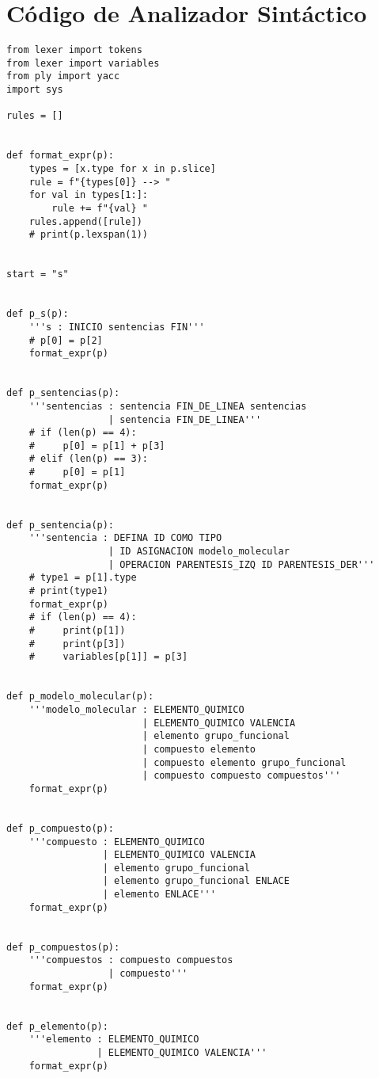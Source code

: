 \label{apendixA}


\chapter{Código de Analizador Sintáctico}

\begin{verbatim}
from lexer import tokens
from lexer import variables
from ply import yacc
import sys

rules = []


def format_expr(p):
    types = [x.type for x in p.slice]
    rule = f"{types[0]} --> "
    for val in types[1:]:
        rule += f"{val} "
    rules.append([rule])
    # print(p.lexspan(1))


start = "s"


def p_s(p):
    '''s : INICIO sentencias FIN'''
    # p[0] = p[2]
    format_expr(p)


def p_sentencias(p):
    '''sentencias : sentencia FIN_DE_LINEA sentencias
                  | sentencia FIN_DE_LINEA'''
    # if (len(p) == 4):
    #     p[0] = p[1] + p[3]
    # elif (len(p) == 3):
    #     p[0] = p[1]
    format_expr(p)


def p_sentencia(p):
    '''sentencia : DEFINA ID COMO TIPO
                  | ID ASIGNACION modelo_molecular
                  | OPERACION PARENTESIS_IZQ ID PARENTESIS_DER'''
    # type1 = p[1].type
    # print(type1)
    format_expr(p)
    # if (len(p) == 4):
    #     print(p[1])
    #     print(p[3])
    #     variables[p[1]] = p[3]


def p_modelo_molecular(p):
    '''modelo_molecular : ELEMENTO_QUIMICO
                        | ELEMENTO_QUIMICO VALENCIA
                        | elemento grupo_funcional
                        | compuesto elemento
                        | compuesto elemento grupo_funcional
                        | compuesto compuesto compuestos'''
    format_expr(p)


def p_compuesto(p):
    '''compuesto : ELEMENTO_QUIMICO
                 | ELEMENTO_QUIMICO VALENCIA
                 | elemento grupo_funcional
                 | elemento grupo_funcional ENLACE
                 | elemento ENLACE'''
    format_expr(p)


def p_compuestos(p):
    '''compuestos : compuesto compuestos
                  | compuesto'''
    format_expr(p)


def p_elemento(p):
    '''elemento : ELEMENTO_QUIMICO
                | ELEMENTO_QUIMICO VALENCIA'''
    format_expr(p)



\end{verbatim}
